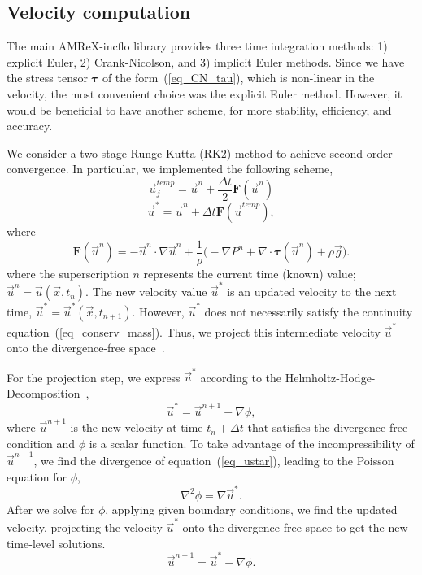 \subsection{Velocity computation}
The main AMReX-incflo library provides three time integration methods: 1) explicit Euler, 2) Crank-Nicolson, and 3) implicit Euler methods. 
Since we have the stress tensor ${\bm \tau}$ of the form~(\ref{eq_CN_tau}), which is non-linear in the velocity, the most convenient choice was the explicit Euler method.
 However, it would be beneficial to have another scheme, for more stability, efficiency, and accuracy. 
 \par
 We consider a two-stage Runge-Kutta (RK2) method to achieve second-order convergence. 
In particular, we implemented the following scheme,
\begin{equation}
	\vec{u}_{j}^{temp} = \vec{u}^{n} + \frac{\Delta t}{2} {\bm F} \left( \vec{u}^{n} \right)
	\label{eq_RK2_s1} 
\end{equation}
\begin{equation}
	\vec{u}^{*} = \vec{u}^{n} + \Delta t {\bm F} \left( \vec{u}^{temp} \right),
	\label{eq_RK2_s2}
\end{equation}
where 
\[
  {\bm F} \left( \vec{u}^{n} \right)= 
    -\vec{u}^n \cdot \nabla \vec{u}^n 
    +\frac{1}{\rho}
    \biggl(
    - \nabla P^n 
        + \nabla \cdot   \bm{\tau}(\vec{u}^n)
        +  \rho  \vec{g} 
        \biggr).
\]
where the superscription $n$ represents the current time (known) value; $\vec{u}^n = \vec{u}(\vec{x}, t_n)$. The new velocity value $\vec{u}^*$ is an updated velocity to the next time, $\vec{u}^*  = \vec{u}^* (\vec{x}, t_{n+1})$. However, $\vec{u}^*$ does not necessarily satisfy the continuity equation~(\ref{eq_conserv_mass}). Thus, we project this intermediate velocity $\vec{u}^*$ onto the divergence-free space~\cite{sverdrup_highly_2018}.
\par
For the projection step, we express $\vec{u}^{*}$ according to the Helmholtz-Hodge-Decomposition~\cite{chorin_mathematical_1993}, 
\begin{equation}
  \vec{u}^* = \vec{u}^{n+1} + \nabla \phi,
  \label{eq_ustar}
\end{equation}
where $\vec{u}^{n+1}$ is the new velocity at time $t_n + \Delta t$ that satisfies the divergence-free condition and $\phi$ is a scalar function.
To take advantage of the incompressibility of $\vec{u}^{n+1}$, we find the divergence of equation~(\ref{eq_ustar}), leading to the Poisson equation for $\phi$,
\[
  \nabla^2 \phi = \nabla \vec{u}^*.  
\]
After we solve for $\phi$, applying given boundary conditions, we find the updated velocity, projecting the velocity $\vec{u}^*$ onto the divergence-free space to get the new time-level solutions.
\[
  \vec{u}^{n+1} = \vec{u}^* - \nabla \phi.
\]

